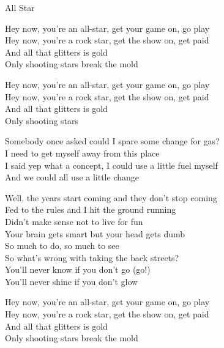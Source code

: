 \begin{song}{All Star}
  \begin{SBChorus}
    Hey now, you're an all-star, get your game on, go play\\
    Hey now, you're a rock star, get the show on, get paid\\
    And all that glitters is gold\\
    Only shooting stars break the mold
  \end{SBChorus}


  \begin{SBChorus}
    Hey now, you're an all-star, get your game on, go play\\
    Hey now, you're a rock star, get the show on, get paid\\
    And all that glitters is gold\\
    Only shooting stars
  \end{SBChorus}

  \begin{SBSection*}
    Somebody once asked could I spare some change for gas?\\
    I need to get myself away from this place\\
    I said yep what a concept, I could use a little fuel myself\\
    And we could all use a little change
  \end{SBSection*}

  \begin{SBVerse}
    Well, the years start coming and they don't stop coming\\
    Fed to the rules and I hit the ground running\\
    Didn't make sense not to live for fun\\
    Your brain gets smart but your head gets dumb\\\medskip
    So much to do, so much to see\\
    So what's wrong with taking the back streets?\\
    You'll never know if you don't go (go!)\\
    You'll never shine if you don't glow
  \end{SBVerse}

  \begin{SBChorus}
    Hey now, you're an all-star, get your game on, go play\\
    Hey now, you're a rock star, get the show on, get paid\\
    And all that glitters is gold\\
    Only shooting stars break the mold
  \end{SBChorus}
\end{song}